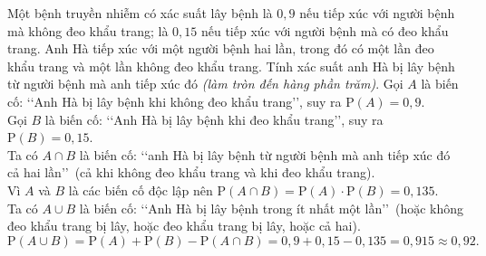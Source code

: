 \begin{bt}%

	Một bệnh truyền nhiễm có xác suất lây bệnh là $0{,}9$ nếu tiếp xúc với người bệnh mà không đeo khẩu trang; là $0{,}15$ nếu tiếp xúc với người bệnh mà có đeo khẩu trang. Anh Hà tiếp xúc với một người bệnh hai lần, trong đó có một lần đeo khẩu trang và một lần không đeo khẩu trang. Tính xác suất anh Hà bị lây bệnh từ người bệnh mà anh tiếp xúc đó \textit{(làm tròn đến hàng phần trăm)}.
	\loigiai
	{
		Gọi $A$ là biến cố: \lq\lq Anh Hà bị lây bệnh khi không đeo khẩu trang\rq\rq, suy ra $\mathrm{P}(A)=0{,}9$.\\
		Gọi $B$ là biến cố: \lq\lq Anh Hà bị lây bệnh khi đeo khẩu trang\rq\rq, suy ra $\mathrm{P}(B)=0{,}15$.\\
		Ta có $A\cap B$ là biến cố: \lq\lq anh Hà bị lây bệnh từ người bệnh mà anh tiếp xúc đó cả hai lần\rq\rq\,  (cả khi không đeo khẩu trang và khi đeo khẩu trang). \\
		Vì $A$ và $B$ là các biến cố độc lập nên $\mathrm{P}(A\cap B)=\mathrm{P}(A)\cdot\mathrm{P}(B)=0{,}135$.\\
		Ta có  $A\cup B$ là biến cố: \lq\lq Anh Hà bị lây bệnh trong ít nhất một lần\rq\rq\, (hoặc không đeo khẩu trang bị lây, hoặc đeo khẩu trang bị lây, hoặc cả hai).
		$$\mathrm{P}(A\cup B)=\mathrm{P}(A)+\mathrm{P}(B) - \mathrm{P}(A\cap B) =0{,}9+0{,}15-0{,}135=0{,}915\approx 0{,}92.$$
	}
\end{bt}

